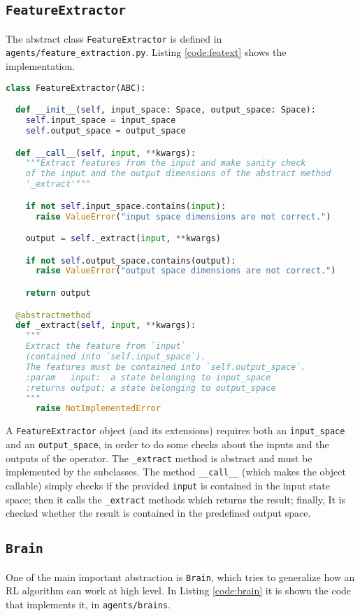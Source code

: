 \subsection{\texttt{FeatureExtractor}}
The abstract class \texttt{FeatureExtractor} is defined in \texttt{agents/feature\_extraction.py}. Listing \ref{code:featext} shows the implementation.
\begin{lstlisting}[style=Python, language=Python, escapechar=£, label={code:featext}, caption={The \texttt{FeatureExtractor} abstraction.}]
class FeatureExtractor(ABC):

  def __init__(self, input_space: Space, output_space: Space):
    self.input_space = input_space
    self.output_space = output_space

  def __call__(self, input, **kwargs):
    """Extract features from the input and make sanity check
    of the input and the output dimensions of the abstract method
    '_extract'"""

    if not self.input_space.contains(input):
      raise ValueError("input space dimensions are not correct.")

    output = self._extract(input, **kwargs)

    if not self.output_space.contains(output):
      raise ValueError("output space dimensions are not correct.")

    return output

  @abstractmethod
  def _extract(self, input, **kwargs):
    """
    Extract the feature from `input`
    (contained into `self.input_space`).
    The features must be contained into `self.output_space`.
    :param   input:  a state belonging to input_space
    :returns output: a state belonging to output_space
    """
      raise NotImplementedError
\end{lstlisting}
A \texttt{FeatureExtractor} object (and its extensions) requires both an \texttt{input\_space} and an \texttt{output\_space}, in order to do some checks about the inputs and the outputs of the operator. The \texttt{\_extract} method is abstract and must be implemented by the subclasses. The method \texttt{\_\_call\_\_} (which makes the object callable) simply checks if the provided \texttt{input} is contained in the input state space; then it calls the \texttt{\_extract} methods which returns the result; finally, It is checked whether the result is contained in the predefined output space.

\subsection{\texttt{Brain}}
One of the main important abstraction is \texttt{Brain}, which tries to generalize how an RL algorithm can work at high level. In  Listing \ref{code:brain} it is shown the code that implements it, in \texttt{agents/brains}.

